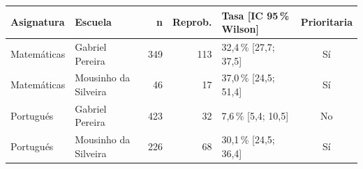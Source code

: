 \begin{tabular}{llrrlc}
\toprule
Asignatura & Escuela & n & Reprob. & Tasa [IC 95\,\% Wilson] & Prioritaria \\
\midrule
Matemáticas & Gabriel Pereira & 349 & 113 & 32,4\,\% [27,7; 37,5] & Sí \\
Matemáticas & Mousinho da Silveira & 46 & 17 & 37,0\,\% [24,5; 51,4] & Sí \\
Portugués & Gabriel Pereira & 423 & 32 & 7,6\,\% [5,4; 10,5] & No \\
Portugués & Mousinho da Silveira & 226 & 68 & 30,1\,\% [24,5; 36,4] & Sí \\
\bottomrule
\end{tabular}
